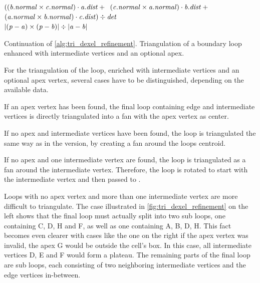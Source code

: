 \begin{algorithm}
\begin{algorithmic}[1]
				\State \Return $((\mathit{b}.\mathit{normal} \times \mathit{c}.\mathit{normal}) \cdot \mathit{a}.\mathit{dist} + {}$\hfill\break
				\hspace*{\dimexpr\algorithmicindent*2}\phantom{\Return $($}$(\mathit{c}.\mathit{normal} \times \mathit{a}.\mathit{normal}) \cdot \mathit{b}.\mathit{dist} + {}$\hfill\break
				\hspace*{\dimexpr\algorithmicindent*2}\phantom{\Return $($}$(\mathit{a}.\mathit{normal} \times \mathit{b}.\mathit{normal}) \cdot \mathit{c}.\mathit{dist}) \div \mathit{det}$
			\EndIf
		\EndFunction
		\\
			\State \Return $|(\mathit{p} - \mathit{a}) \times (\mathit{p} - \mathit{b})| \div |\mathit{a} - \mathit{b}|$
		\EndFunction
	\end{algorithmic}
	\caption{
		Continuation of \cref{alg:tri_dexel_refinement}.
		Triangulation of a boundary loop enhanced with intermediate vertices and an optional apex.
	}
	\label{alg:tri_dexel_refinement_triangulation}
\end{algorithm}
%
For the triangulation of the loop, enriched with intermediate vertices and an optional apex vertex, several cases have to be distinguished, depending on the available data.

If an apex vertex has been found, the final loop containing edge and intermediate vertices is directly triangulated into a fan with the apex vertex as center.

If no apex and intermediate vertices have been found, the loop is triangulated the same way as in the  version, by creating a fan around the loops centroid.

If no apex and one intermediate vertex are found, the loop is triangulated as a fan around the intermediate vertex.
Therefore, the loop is rotated to start with the intermediate vertex and then passed to .

Loops with no apex vertex and more than one intermediate vertex are more difficult to triangulate.
The case illustrated in \cref{fig:tri_dexel_refinement} on the left shows that the final loop must actually split into two sub loops, one containing C, D, H and F, as well as one containing A, B, D, H.
This fact becomes even clearer with cases like the one on the right if the apex vertex was invalid, \eg the apex G would be outside the cell's box.
In this case, all intermediate vertices D, E and F would form a plateau.
The remaining parts of the final loop are sub loops, each consisting of two neighboring intermediate vertices and the edge vertices in-between.

